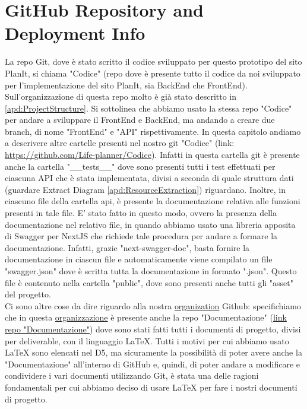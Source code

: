 \section{GitHub Repository and Deployment Info}
\label{secD4:GitHubRepositoryAndDeploymentInfo}
La repo Git, dove è stato scritto il codice sviluppato per questo prototipo del sito PlanIt, si chiama "Codice" (repo dove è presente tutto il codice da noi sviluppato per l'implementazione del sito PlanIt, sia BackEnd che FrontEnd). Sull'organizzazione di questa repo molto è già stato descritto in \ref{apd:ProjectStructure}. Si sottolinea che abbiamo usato la stessa repo "Codice" per andare a sviluppare il FrontEnd e BackEnd, ma andando a creare due branch, di nome "FrontEnd" e "API" rispettivamente. In questa capitolo andiamo a descrivere altre cartelle presenti nel nostro git "Codice" (link: \url{https://github.com/Life-planner/Codice}). Infatti in questa cartella git è presente anche la cartella "\_\_tests\_\_" dove sono presenti tutti i test effettuati per ciascuna API che è stata implementata, divisi a seconda di quale struttura dati (guardare Extract Diagram \ref{apd:ResourceExtraction}) riguardano. Inoltre, in  ciascuno file della cartella api, è presente la documentazione relativa alle funzioni presenti in tale file. E' stato fatto in questo modo, ovvero la presenza della documentazione nel relativo file, in quando abbiamo usato una libreria apposita di Swagger per NextJS che richiede tale procedura per andare a formare la documentazione. Infatti, grazie "next-swagger-doc", basta fornire la documentazione in ciascun file e automaticamente viene compilato un file "swagger.json" dove è scritta tutta la documentazione in formato ".json". Questo file è contenuto nella cartella "public", dove sono presenti anche tutti gli "asset" del progetto.\\
Ci sono altre cose da dire riguardo alla nostra \href{https://github.com/orgs/Life-planner/repositories}{organization} Github: specifichiamo che in questa \href{https://github.com/orgs/Life-planner/repositories}{organizzazione} è presente anche la repo "Documentazione" (\href{https://github.com/Life-planner/Documentazione}{link repo "Documentazione"}) dove sono stati fatti tutti i documenti di progetto, divisi per deliverable, con il linguaggio LaTeX. Tutti i motivi per cui abbiamo usato LaTeX sono elencati nel D5, ma sicuramente la possibilità di poter avere anche la "Documentazione" all'interno di GitHub e, quindi, di poter andare a modificare e condividere i vari documenti utilizzando Git, è stata una delle ragioni fondamentali per cui abbiamo deciso di usare LaTeX per fare i nostri documenti di progetto. \\
